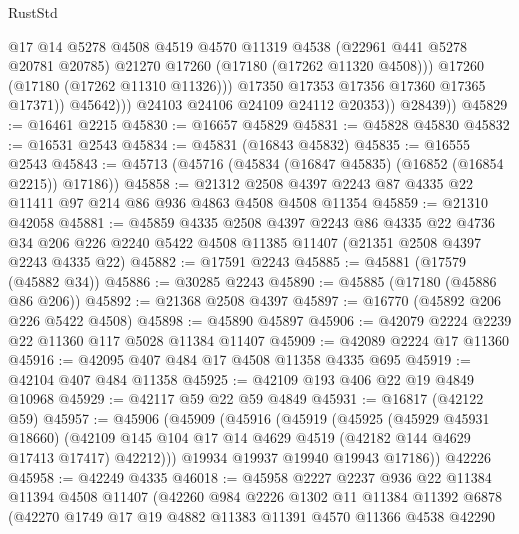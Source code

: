 \begin{lexlean}{RustStd}
\begin{coremodule}
{\begin{coremodule}
{{{{{{{{{{{{{{{{{{{{{{{{{{{{{{{{{{{{{{{{{{{{{{{{{{{{{{{                          @17
                          @14
                          @5278
                          @4508
                          @4519
                          @4570
                          @11319
                          @4538
                          (@22961 @441 @5278 @20781 @20785)
                          @21270
                          @17260
                          (@17180 (@17262 @11320 @4508)))
                        @17260
                        (@17180 (@17262 @11310 @11326)))
                      @17350
                      @17353
                      @17356
                      @17360
                      @17365
                      @17371))
                  @45642)))
            @24103
            @24106
            @24109
            @24112
            @20353))
        @28439))
@45829 := @16461 @2215
@45830 := @16657 @45829
@45831 := @45828 @45830
@45832 := @16531 @2543
@45834 := @45831 (@16843 @45832)
@45835 := @16555 @2543
@45843 := @45713 (@45716 (@45834 (@16847 @45835) (@16852 (@16854 @2215)) @17186))
@45858 := @21312 @2508 @4397 @2243 @87 @4335 @22 @11411 @97 @214 @86 @936 @4863 @4508 @4508 @11354
@45859 := @21310 @42058
@45881 := @45859
    @4335
    @2508
    @4397
    @2243
    @86
    @4335
    @22
    @4736
    @34
    @206
    @226
    @2240
    @5422
    @4508
    @11385
    @11407
    (@21351 @2508 @4397 @2243 @4335 @22)
@45882 := @17591 @2243
@45885 := @45881 (@17579 (@45882 @34))
@45886 := @30285 @2243
@45890 := @45885 (@17180 (@45886 @86 @206))
@45892 := @21368 @2508 @4397
@45897 := @16770 (@45892 @206 @226 @5422 @4508)
@45898 := @45890 @45897
@45906 := @42079 @2224 @2239 @22 @11360 @117 @5028 @11384 @11407
@45909 := @42089 @2224 @17 @11360
@45916 := @42095 @407 @484 @17 @4508 @11358 @4335 @695
@45919 := @42104 @407 @484 @11358
@45925 := @42109 @193 @406 @22 @19 @4849 @10968
@45929 := @42117 @59 @22 @59 @4849
@45931 := @16817 (@42122 @59)
@45957 := @45906
    (@45909
      (@45916
        (@45919
          (@45925
            (@45929 @45931 @18660)
            (@42109 @145 @104 @17 @14 @4629 @4519 (@42182 @144 @4629 @17413 @17417) @42212)))
        @19934
        @19937
        @19940
        @19943
        @17186))
    @42226
@45958 := @42249 @4335
@46018 := @45958
    @2227
    @2237
    @936
    @22
    @11384
    @11394
    @4508
    @11407
    (@42260
      @984
      @2226
      @1302
      @11
      @11384
      @11392
      @6878
      (@42270
        @1749
        @17
        @19
        @4882
        @11383
        @11391
        @4570
        @11366
        @4538
        @42290
}}}}}}}}}}}}}}}}}}}}}}}}}}}}}}}}}}}}}}}}}}}}}}}}}}}}}}}
\end{coremodule}}
\end{coremodule}
\end{lexlean}
